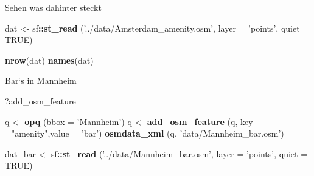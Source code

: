 \documentclass[ignorenonframetext,]{beamer}
\newenvironment{Shaded}{\begin{snugshade}}{\end{snugshade}}
\newcommand{\KeywordTok}[1]{\textcolor[rgb]{0.13,0.29,0.53}{\textbf{#1}}}
\newcommand{\DataTypeTok}[1]{\textcolor[rgb]{0.13,0.29,0.53}{#1}}
\newcommand{\StringTok}[1]{\textcolor[rgb]{0.31,0.60,0.02}{#1}}
\newcommand{\OtherTok}[1]{\textcolor[rgb]{0.56,0.35,0.01}{#1}}
\newcommand{\OperatorTok}[1]{\textcolor[rgb]{0.81,0.36,0.00}{\textbf{#1}}}
\newcommand{\NormalTok}[1]{#1}
\begin{document}
\begin{frame}[fragile]{Sehen was dahinter steckt}

\begin{Shaded}
\begin{Highlighting}[]
\NormalTok{dat <-}\StringTok{ }\NormalTok{sf}\OperatorTok{::}\KeywordTok{st_read}\NormalTok{ (}\StringTok{'../data/Amsterdam_amenity.osm'}\NormalTok{, }
                    \DataTypeTok{layer =} \StringTok{'points'}\NormalTok{, }
                    \DataTypeTok{quiet =} \OtherTok{TRUE}\NormalTok{)}
\end{Highlighting}
\end{Shaded}

\begin{Shaded}
\begin{Highlighting}[]
\KeywordTok{nrow}\NormalTok{(dat)}
\KeywordTok{names}\NormalTok{(dat)}
\end{Highlighting}
\end{Shaded}

\end{frame}

\begin{frame}[fragile]{Bar`s in Mannheim}

\begin{Shaded}
\begin{Highlighting}[]
\NormalTok{?add_osm_feature}
\end{Highlighting}
\end{Shaded}

\begin{Shaded}
\begin{Highlighting}[]
\NormalTok{q <-}\StringTok{ }\KeywordTok{opq}\NormalTok{ (}\DataTypeTok{bbox =} \StringTok{'Mannheim'}\NormalTok{)}
\NormalTok{q <-}\StringTok{ }\KeywordTok{add_osm_feature}\NormalTok{ (q, }\DataTypeTok{key =}\StringTok{"amenity"}\NormalTok{,}\DataTypeTok{value =} \StringTok{'bar'}\NormalTok{) }
\KeywordTok{osmdata_xml}\NormalTok{ (q, }\StringTok{'data/Mannheim_bar.osm'}\NormalTok{)}
\end{Highlighting}
\end{Shaded}

\begin{Shaded}
\begin{Highlighting}[]
\NormalTok{dat_bar <-}\StringTok{ }\NormalTok{sf}\OperatorTok{::}\KeywordTok{st_read}\NormalTok{ (}\StringTok{'../data/Mannheim_bar.osm'}\NormalTok{, }
                        \DataTypeTok{layer =} \StringTok{'points'}\NormalTok{, }\DataTypeTok{quiet =} \OtherTok{TRUE}\NormalTok{)}
\end{Highlighting}
\end{Shaded}

\end{frame}
\end{document}
